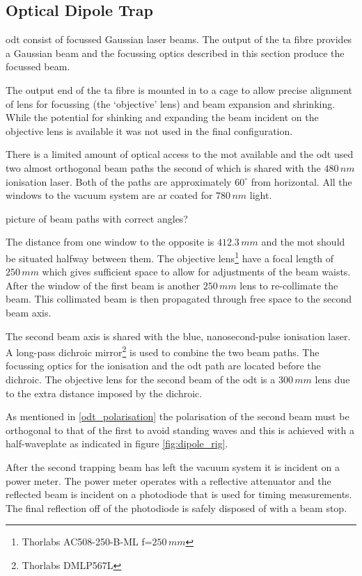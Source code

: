 \subsection{Optical Dipole Trap}

\Gls{odt} consist of focussed Gaussian laser beams. The output of the \gls{ta} fibre provides a Gaussian beam and the focussing optics described in this section produce the focussed beam.

The output end of the \gls{ta} fibre is mounted in to a cage to allow precise alignment of lens for focussing (the `objective' lens) and beam expansion and shrinking. While the potential for shinking and expanding the beam incident on the objective lens is available it was not used in the final configuration.

There is a limited amount of optical access to the \gls{mot} available and the \gls{odt} used two almost orthogonal beam paths the second of which is shared with the $480\,\unit{nm}$ ionisation laser. Both of the paths are approximately $60^{\circ}$ from horizontal. All the windows to the vacuum system are \gls{ar} coated for $780\,\unit{nm}$ light.

{\color{red} picture of beam paths with correct angles?}

The distance from one window to the opposite is $412.3\,\unit{mm}$ and the \gls{mot} should be situated halfway between them. The objective lens\footnote{Thorlabs AC508-250-B-ML f=$250\,\unit{mm}$} have a focal length of $250\,\unit{mm}$ which gives sufficient space to allow for adjustments of the beam waists. After the window of the first beam is another $250\,\unit{mm}$ lens to re-collimate the beam. This collimated beam is then propagated through free space to the second beam axis.

The second beam axis is shared with the blue, nanosecond-pulse ionisation laser. A long-pass dichroic mirror\footnote{Thorlabs DMLP567L} is used to combine the two beam paths. The focussing optics for the ionisation and the \gls{odt} path are located before the dichroic. The objective lens for the second beam of the \gls{odt} is a $300\,\unit{mm}$ lens due to the extra distance imposed by the dichroic.

As mentioned in \ref{odt_polarisation} the polarisation of the second beam must be orthogonal to that of the first to avoid standing waves and this is achieved with a half-waveplate as indicated in figure \ref{fig:dipole_rig}.

After the second trapping beam has left the vacuum system it is incident on a power meter. The power meter operates with a reflective attenuator and the reflected beam is incident on a photodiode that is used for timing measurements. The final reflection off of the photodiode is safely disposed of with a beam stop.

